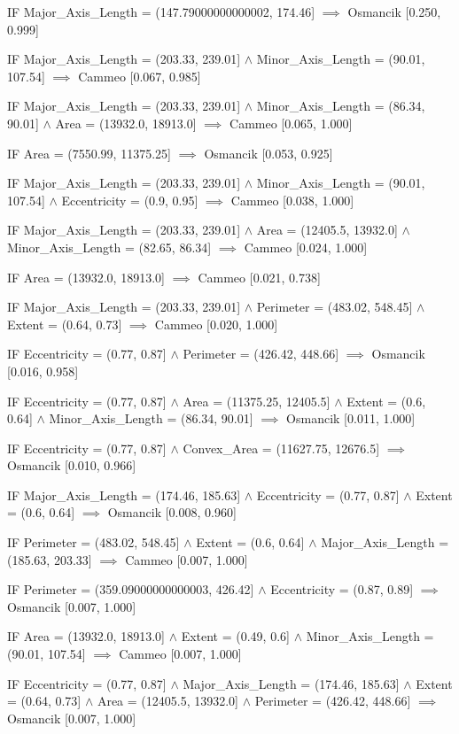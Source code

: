 IF Major_Axis_Length = (147.79000000000002, 174.46] $\implies$ Osmancik [0.250, 0.999]

IF Major_Axis_Length = (203.33, 239.01] $\land$ Minor_Axis_Length = (90.01, 107.54] $\implies$ Cammeo [0.067, 0.985]

IF Major_Axis_Length = (203.33, 239.01] $\land$ Minor_Axis_Length = (86.34, 90.01] $\land$ Area = (13932.0, 18913.0] $\implies$ Cammeo [0.065, 1.000]

IF Area = (7550.99, 11375.25] $\implies$ Osmancik [0.053, 0.925]

IF Major_Axis_Length = (203.33, 239.01] $\land$ Minor_Axis_Length = (90.01, 107.54] $\land$ Eccentricity = (0.9, 0.95] $\implies$ Cammeo [0.038, 1.000]

IF Major_Axis_Length = (203.33, 239.01] $\land$ Area = (12405.5, 13932.0] $\land$ Minor_Axis_Length = (82.65, 86.34] $\implies$ Cammeo [0.024, 1.000]

IF Area = (13932.0, 18913.0] $\implies$ Cammeo [0.021, 0.738]

IF Major_Axis_Length = (203.33, 239.01] $\land$ Perimeter = (483.02, 548.45] $\land$ Extent = (0.64, 0.73] $\implies$ Cammeo [0.020, 1.000]

IF Eccentricity = (0.77, 0.87] $\land$ Perimeter = (426.42, 448.66] $\implies$ Osmancik [0.016, 0.958]

IF Eccentricity = (0.77, 0.87] $\land$ Area = (11375.25, 12405.5] $\land$ Extent = (0.6, 0.64] $\land$ Minor_Axis_Length = (86.34, 90.01] $\implies$ Osmancik [0.011, 1.000]

IF Eccentricity = (0.77, 0.87] $\land$ Convex_Area = (11627.75, 12676.5] $\implies$ Osmancik [0.010, 0.966]

IF Major_Axis_Length = (174.46, 185.63] $\land$ Eccentricity = (0.77, 0.87] $\land$ Extent = (0.6, 0.64] $\implies$ Osmancik [0.008, 0.960]

IF Perimeter = (483.02, 548.45] $\land$ Extent = (0.6, 0.64] $\land$ Major_Axis_Length = (185.63, 203.33] $\implies$ Cammeo [0.007, 1.000]

IF Perimeter = (359.09000000000003, 426.42] $\land$ Eccentricity = (0.87, 0.89] $\implies$ Osmancik [0.007, 1.000]

IF Area = (13932.0, 18913.0] $\land$ Extent = (0.49, 0.6] $\land$ Minor_Axis_Length = (90.01, 107.54] $\implies$ Cammeo [0.007, 1.000]

IF Eccentricity = (0.77, 0.87] $\land$ Major_Axis_Length = (174.46, 185.63] $\land$ Extent = (0.64, 0.73] $\land$ Area = (12405.5, 13932.0] $\land$ Perimeter = (426.42, 448.66] $\implies$ Osmancik [0.007, 1.000]

